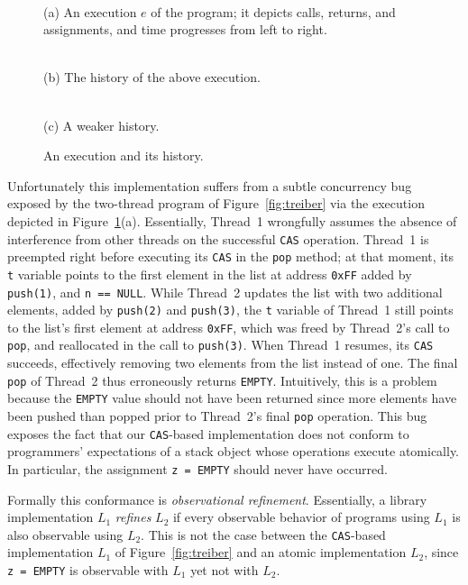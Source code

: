 \begin{figure}[t]
  \footnotesize
  \centering
   \\
  \smallskip
  \parbox{0.8\linewidth}{(a) An execution $e$ of the program; it depicts calls,
  returns, and assignments, and time progresses from left to right.}

  \bigskip
  \begin{minipage}{45mm}
     \\
    (b) The history of the above execution.
  \end{minipage}
  \hfill
  \begin{minipage}{35mm}
     \\
    (c) A weaker history.
  \end{minipage}

  \caption{An execution and its history.}
  \label{fig:stacks}
\end{figure}

Unfortunately this implementation suffers from a subtle concurrency
bug~\cite{tr/ibm/Michael04} exposed by the two-thread program of
Figure~\ref{fig:treiber} via the execution depicted in
Figure~\ref{fig:stacks}(a). Essentially, Thread~1 wrongfully assumes the
absence of interference from other threads on the successful {\tt CAS}
operation. Thread~1 is preempted right before executing its {\tt CAS} in the
{\tt pop} method; at that moment, its {\tt t} variable points to the first
element in the list at address {\tt 0xFF} added by {\tt push(1)}, and {\tt n ==
NULL}. While Thread~2 updates the list with two additional elements, added by
{\tt push(2)} and {\tt push(3)}, the {\tt t} variable of Thread~1 still points
to the list's first element at address {\tt 0xFF}, which was freed by
Thread~2's call to {\tt pop}, and reallocated in the call to {\tt push(3)}.
When Thread~1 resumes, its {\tt CAS} succeeds, effectively removing two
elements from the list instead of one. The final {\tt pop} of Thread~2 thus
erroneously returns {\tt EMPTY}. Intuitively, this is a problem because the
{\tt EMPTY} value should not have been returned since more elements have been
pushed than popped prior to Thread~2's final {\tt pop} operation. This bug
exposes the fact that our {\tt CAS}-based implementation does not conform to
programmers' expectations of a stack object whose operations execute
atomically. In particular, the assignment {\tt z = EMPTY} should never have
occurred.

Formally this conformance is \emph{observational refinement}. Essentially, a
library implementation $L_1$ \emph{refines} $L_2$ if every observable behavior
of programs using $L_1$ is also observable using $L_2$. This is not the case
between the {\tt CAS}-based implementation $L_1$ of Figure~\ref{fig:treiber}
and an atomic implementation $L_2$, since {\tt z = EMPTY} is observable with
$L_1$ yet not with $L_2$.

